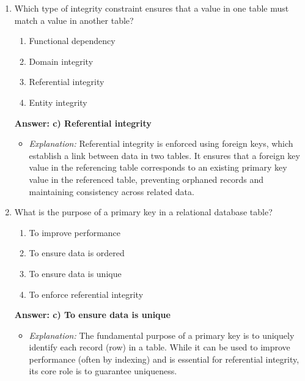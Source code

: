 \documentclass{article}
\begin{document}
\begin{enumerate}[label=\textbf{Question \arabic*.}]
\item Which type of integrity constraint ensures that a value in one table must match a value in another table?
    \begin{enumerate}[label=\alph*)]
        \item Functional dependency
        \item Domain integrity
        \item Referential integrity
        \item Entity integrity
    \end{enumerate}
    \textbf{Answer: c) Referential integrity}
    \begin{itemize}
        \item \textit{Explanation:} Referential integrity is enforced using foreign keys, which establish a link between data in two tables. It ensures that a foreign key value in the referencing table corresponds to an existing primary key value in the referenced table, preventing orphaned records and maintaining consistency across related data.
    \end{itemize}

\item What is the purpose of a primary key in a relational database table?
    \begin{enumerate}[label=\alph*)]
        \item To improve performance
        \item To ensure data is ordered
        \item To ensure data is unique
        \item To enforce referential integrity
    \end{enumerate}
    \textbf{Answer: c) To ensure data is unique}
    \begin{itemize}
        \item \textit{Explanation:} The fundamental purpose of a primary key is to uniquely identify each record (row) in a table. While it can be used to improve performance (often by indexing) and is essential for referential integrity, its core role is to guarantee uniqueness.
    \end{itemize}


\end{enumerate}
\end{document}
